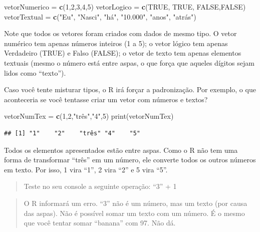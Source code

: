 \documentclass[
]{book}
\newenvironment{Shaded}{\begin{snugshade}}{\end{snugshade}}
\newcommand{\DecValTok}[1]{\textcolor[rgb]{0.00,0.00,0.81}{#1}}
\newcommand{\KeywordTok}[1]{\textcolor[rgb]{0.13,0.29,0.53}{\textbf{#1}}}
\newcommand{\NormalTok}[1]{#1}
\newcommand{\OtherTok}[1]{\textcolor[rgb]{0.56,0.35,0.01}{#1}}
\newcommand{\StringTok}[1]{\textcolor[rgb]{0.31,0.60,0.02}{#1}}
\begin{document}
\begin{Shaded}
\begin{Highlighting}[]
\NormalTok{vetorNumerico =}\StringTok{ }\KeywordTok{c}\NormalTok{(}\DecValTok{1}\NormalTok{,}\DecValTok{2}\NormalTok{,}\DecValTok{3}\NormalTok{,}\DecValTok{4}\NormalTok{,}\DecValTok{5}\NormalTok{)}
\NormalTok{vetorLogico =}\StringTok{ }\KeywordTok{c}\NormalTok{(}\OtherTok{TRUE}\NormalTok{, }\OtherTok{TRUE}\NormalTok{, }\OtherTok{FALSE}\NormalTok{,}\OtherTok{FALSE}\NormalTok{)}
\NormalTok{vetorTextual =}\StringTok{ }\KeywordTok{c}\NormalTok{(}\StringTok{"Eu"}\NormalTok{, }\StringTok{"Nasci"}\NormalTok{, }\StringTok{"há"}\NormalTok{, }\StringTok{"10.000"}\NormalTok{, }\StringTok{"anos"}\NormalTok{, }\StringTok{"atrás"}\NormalTok{)}
\end{Highlighting}
\end{Shaded}

Note que todos os vetores foram criados com dados de mesmo tipo. O vetor numérico tem apenas números inteiros (1 a 5); o vetor lógico tem apenas Verdadeiro (TRUE) e Falso (FALSE); o vetor de texto tem apenas elementos textuais (mesmo o número está entre aspas, o que força que aqueles dígitos sejam lidos como ``texto'').

Caso você tente misturar tipos, o R irá forçar a padronização. Por exemplo, o que aconteceria se você tentasse criar um vetor com números e textos?

\begin{Shaded}
\begin{Highlighting}[]
\NormalTok{vetorNumTex =}\StringTok{ }\KeywordTok{c}\NormalTok{(}\DecValTok{1}\NormalTok{,}\DecValTok{2}\NormalTok{,}\StringTok{"três","}\DecValTok{4}\StringTok{",5)}
\StringTok{print(vetorNumTex)}
\end{Highlighting}
\end{Shaded}

\begin{verbatim}
## [1] "1"    "2"    "três" "4"    "5"
\end{verbatim}

Todos os elementos apresentados estão entre aspas. Como o R não tem uma forma de transformar ``três'' em um número, ele converte todos os outros números em texto. Por isso, 1 vira ``1'', 2 vira ``2'' e 5 vira ``5''.

\begin{quote}
Teste no seu console a seguinte operação: ``3'' + 1
\end{quote}

\begin{quote}
O R informará um erro. ``3'' não é um número, mas um texto (por causa das aspas). Não é possível somar um texto com um número. É o mesmo que você tentar somar ``banana'' com 97. Não dá.
\end{quote}
\end{document}
